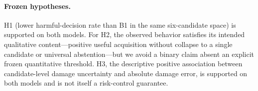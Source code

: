 \documentclass{article} %
\begin{document}
\paragraph{Frozen hypotheses.}
H1 (lower harmful-decision rate than B1 in the same six-candidate space) is
supported on both models. For H2, the observed behavior satisfies its intended
qualitative content---positive useful acquisition without collapse to a single
candidate or universal abstention---but we avoid a binary claim absent an
explicit frozen quantitative threshold. H3, the descriptive positive
association between candidate-level damage uncertainty and absolute damage
error, is supported on both models and is not itself a risk-control guarantee.



\end{document}
